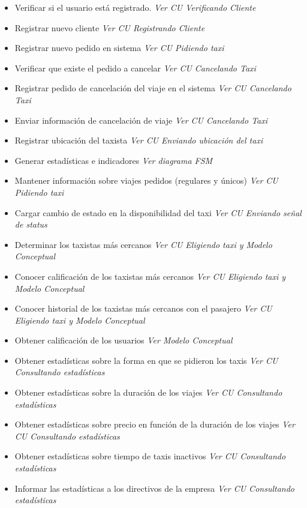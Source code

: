 \documentclass[a4paper]{article}
\begin{document}
\begin{itemize}
\item Verificar si el usuario est\'a registrado. \textit{Ver CU Verificando Cliente}
\item Registrar nuevo cliente \textit{Ver CU Registrando Cliente}
\item Registrar nuevo pedido en sistema \textit{Ver CU Pidiendo taxi}
\item Verificar que existe el pedido a cancelar \textit{Ver CU Cancelando Taxi}
\item Registrar pedido de cancelaci\'on del viaje en el sistema \textit{Ver CU Cancelando Taxi}
\item Enviar informaci\'on de cancelaci\'on de viaje \textit{Ver CU Cancelando Taxi}
\item Registrar ubicaci\'on del taxista \textit{Ver CU Enviando ubicaci\'on del taxi}
\item Generar estad\'isticas e indicadores \textit{Ver diagrama FSM}
\item Mantener informaci\'on sobre viajes pedidos (regulares  y \'unicos) \textit{Ver CU Pidiendo taxi}
\item Cargar cambio de estado en la disponibilidad del taxi \textit{Ver CU Enviando se\~nal de status}
\item Determinar los taxistas m\'as cercanos \textit{Ver CU Eligiendo taxi y Modelo Conceptual}
\item Conocer calificaci\'on de los taxistas m\'as cercanos \textit{Ver CU Eligiendo taxi y Modelo Conceptual}
\item Conocer historial de los taxistas m\'as cercanos con el pasajero \textit{Ver CU Eligiendo taxi y Modelo Conceptual}
\item Obtener calificaci\'on de los usuarios \textit{Ver Modelo Conceptual}
\item Obtener estad\'isticas sobre la forma en que se pidieron los taxis \textit{Ver CU Consultando estad\'isticas}
\item Obtener estad\'isticas sobre la duraci\'on de los viajes \textit{Ver CU Consultando estad\'isticas}
\item Obtener estad\'isticas sobre precio en funci\'on de la duraci\'on de los viajes \textit{Ver CU Consultando estad\'isticas}
\item Obtener estad\'isticas sobre tiempo de taxis inactivos \textit{Ver CU Consultando estad\'isticas}
\item Informar las estad\'isticas a los directivos de la empresa \textit{Ver CU Consultando estad\'isticas}

\end{itemize}
\end{document}
